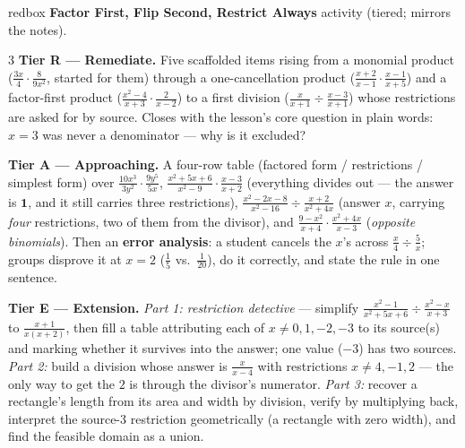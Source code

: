 \documentclass[10pt]{article}
\begin{document}
\begin{skillbox}{redbox}
\textbf{Factor First, Flip Second, Restrict Always} activity (tiered; mirrors the notes).
\begin{multicols}{3}
\textbf{Tier R --- Remediate.} Five scaffolded items rising from a monomial product
($\frac{3x}{4}\cdot\frac{8}{9x^2}$, started for them) through a one-cancellation product
($\frac{x+2}{x-1}\cdot\frac{x-1}{x+5}$) and a factor-first product ($\frac{x^2-4}{x+3}\cdot\frac{2}{x-2}$)
to a first division ($\frac{x}{x+1}\div\frac{x-3}{x+1}$) whose restrictions are asked for by source.
Closes with the lesson's core question in plain words: $x=3$ was never a denominator --- why is it
excluded?

\columnbreak
\textbf{Tier A --- Approaching.} A four-row table (factored form / restrictions / simplest form) over
$\frac{10x^3}{3y^2}\cdot\frac{9y^5}{5x}$, $\frac{x^2+5x+6}{x^2-9}\cdot\frac{x-3}{x+2}$ (everything
divides out --- the answer is $\mathbf{1}$, and it still carries three restrictions),
$\frac{x^2-2x-8}{x^2-16}\div\frac{x+2}{x^2+4x}$ (answer $x$, carrying \emph{four} restrictions, two of
them from the divisor), and $\frac{9-x^2}{x+4}\cdot\frac{x^2+4x}{x-3}$ (\emph{opposite binomials}).
Then an \textbf{error analysis}: a student cancels the $x$'s across $\frac x4\div\frac5x$; groups
disprove it at $x=2$ ($\frac15$ vs.\ $\frac1{20}$), do it correctly, and state the rule in one
sentence.

\columnbreak
\textbf{Tier E --- Extension.} \emph{Part 1: restriction detective} --- simplify
$\frac{x^2-1}{x^2+5x+6}\div\frac{x^2-x}{x+3}$ to $\frac{x+1}{x(x+2)}$, then fill a table attributing
each of $x\neq0,1,-2,-3$ to its source(s) and marking whether it survives into the answer; one value
($-3$) has two sources. \emph{Part 2:} build a division whose answer is $\frac{x}{x-4}$ with
restrictions $x\neq4,-1,2$ --- the only way to get the $2$ is through the divisor's numerator.
\emph{Part 3:} recover a rectangle's length from its area and width by division, verify by multiplying
back, interpret the source-3 restriction geometrically (a rectangle with zero width), and find the
feasible domain as a union.
\end{multicols}
\end{skillbox}
\end{document}
